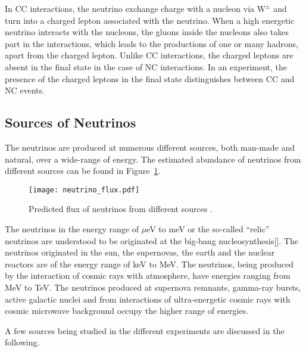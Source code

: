 In CC interactions, the neutrino exchange charge with a nucleon via $\mathrm{W}^{\pm}$ and turn into a charged lepton associated with the neutrino. When a high energetic neutrino interacts with the nucleons, the gluons inside the nucleons also takes part in the interactions, which leads to the productions of one or many hadrons, apart from the charged lepton. Unlike CC interactions, the charged leptons are absent in the final state in the case of NC interactions. In an experiment, the presence of the charged leptons in the final state distinguishes between CC and NC events.

\subsection{Sources of Neutrinos}
The neutrinos are produced at numerous different sources, both \mbox{man-made} and natural, over a wide-range of energy. The estimated abundance of neutrinos from different sources can be found in Figure~\ref{fig:neutrino_flux}. 
\begin{figure}[h]
  \centering
  \texttt{[image: neutrino\_flux.pdf]}
  \caption{Predicted flux of neutrinos from different sources \cite{neutrinoflux}.}
  \label{fig:neutrino_flux}
\end{figure}

The neutrinos in the energy range of $\mu$eV to meV or the so-called ``relic'' neutrinos are understood to be originated at the big-bang nucleosynthesis[\cite{nucleosynthesis}]. The neutrinos originated in the sun\cite{raydavis}, the supernovas, the earth\cite{kamland,borexino} and the nuclear reactors are of the energy range of keV to MeV. The neutrinos, being produced by the interaction of cosmic rays with atmosphere, have energies ranging from MeV to TeV. The neutrinos produced at supernova remnants, gamma-ray bursts, active galactic nuclei and from interactions of ultra-energetic cosmic rays with cosmic microwave background occupy the higher range of energies.

A few sources being studied in the different experiments are discussed in the following.

